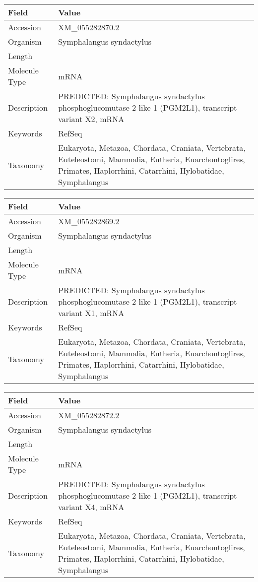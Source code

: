 \documentclass[10pt]{article}
\begin{document}
{\footnotesize
\begin{longtable}{>{\raggedright\arraybackslash}p{4.5cm} >{\raggedright\arraybackslash}p{11.5cm}}
\textbf{Field} & \textbf{Value} \\
\hline
Accession & XM\_055282870.2 \\
Organism & Symphalangus syndactylus \\
Length & 8146 \\
Molecule Type & mRNA \\
Description & PREDICTED: Symphalangus syndactylus phosphoglucomutase 2 like 1 (PGM2L1), transcript variant X2, mRNA \\
Keywords & RefSeq \\
Taxonomy & Eukaryota, Metazoa, Chordata, Craniata, Vertebrata, Euteleostomi, Mammalia, Eutheria, Euarchontoglires, Primates, Haplorrhini, Catarrhini, Hylobatidae, Symphalangus \\
\end{longtable}
}

{\footnotesize
\begin{longtable}{>{\raggedright\arraybackslash}p{4.5cm} >{\raggedright\arraybackslash}p{11.5cm}}
\textbf{Field} & \textbf{Value} \\
\hline
Accession & XM\_055282869.2 \\
Organism & Symphalangus syndactylus \\
Length & 8542 \\
Molecule Type & mRNA \\
Description & PREDICTED: Symphalangus syndactylus phosphoglucomutase 2 like 1 (PGM2L1), transcript variant X1, mRNA \\
Keywords & RefSeq \\
Taxonomy & Eukaryota, Metazoa, Chordata, Craniata, Vertebrata, Euteleostomi, Mammalia, Eutheria, Euarchontoglires, Primates, Haplorrhini, Catarrhini, Hylobatidae, Symphalangus \\
\end{longtable}
}

{\footnotesize
\begin{longtable}{>{\raggedright\arraybackslash}p{4.5cm} >{\raggedright\arraybackslash}p{11.5cm}}
\textbf{Field} & \textbf{Value} \\
\hline
Accession & XM\_055282872.2 \\
Organism & Symphalangus syndactylus \\
Length & 8117 \\
Molecule Type & mRNA \\
Description & PREDICTED: Symphalangus syndactylus phosphoglucomutase 2 like 1 (PGM2L1), transcript variant X4, mRNA \\
Keywords & RefSeq \\
Taxonomy & Eukaryota, Metazoa, Chordata, Craniata, Vertebrata, Euteleostomi, Mammalia, Eutheria, Euarchontoglires, Primates, Haplorrhini, Catarrhini, Hylobatidae, Symphalangus \\
\end{longtable}
}
\end{document}
